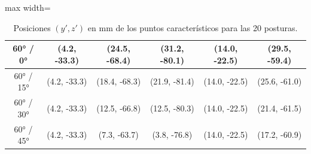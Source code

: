 \begin{table}[H]
\begin{adjustbox}{max width=\textwidth}
\begin{tabular}{|c|c|c|c|c|c|}
60° / 0° & (4.2, -33.3) & (24.5, -68.4) & (31.2, -80.1) & (14.0, -22.5) & (29.5, -59.4) \\ \hline
60° / 15° & (4.2, -33.3) & (18.4, -68.3) & (21.9, -81.4) & (14.0, -22.5) & (25.6, -61.0) \\ \hline
60° / 30° & (4.2, -33.3) & (12.5, -66.8) & (12.5, -80.3) & (14.0, -22.5) & (21.4, -61.5) \\ \hline
60° / 45° & (4.2, -33.3) & (7.3, -63.7) & (3.8, -76.8) & (14.0, -22.5) & (17.2, -60.9) \\ \hline
\end{tabular}
\end{adjustbox}
\caption{Posiciones $(y', z')$ en mm de los puntos característicos para las 20 posturas.}
\label{tab:posiciones}
\end{table}